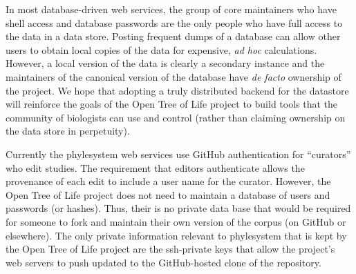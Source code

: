 \documentclass{bioinfo}
\newcommand{\ps}{phylesystem\xspace}
\newcommand{\otol}{Open Tree of Life\xspace}
\begin{document}
In most database-driven web services, the group of core maintainers who have shell access and 
    database passwords are the only people who have full access to the data in a data store.
Posting frequent dumps of a database can allow other users to obtain local copies of the data 
    for expensive, {\em ad hoc} calculations.
However, a local version of the data is clearly a secondary instance and the maintainers of the 
    canonical version of the database have {\em de facto} ownership of the project.
We hope that adopting a truly distributed backend for the datastore will reinforce the goals
    of the \otol project to build tools that the community of biologists can use and control
    (rather than claiming ownership on the data store in perpetuity).

Currently the \ps web services use GitHub authentication for ``curators'' who edit studies.
The requirement that editors authenticate allows the provenance of each edit to include 
    a user name for the curator.
However, the \otol project does not need to maintain a database of users and passwords (or hashes).
Thus, their is no private data base that would be required for someone to fork and maintain their
    own version of the corpus (on GitHub or elsewhere).
The only private information relevant to \ps that is kept by the \otol project are the ssh-private
    keys that allow the project's web servers to push updated to the GitHub-hosted clone of the 
    repository.
\end{document}
